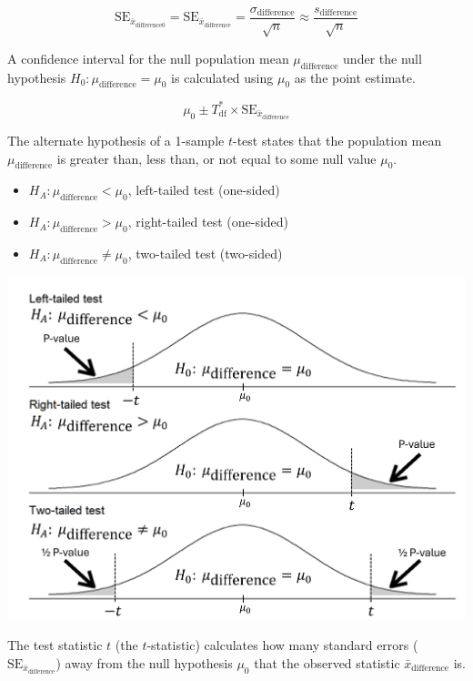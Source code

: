 \documentclass[
  letterpaper,
  DIV=11,
  numbers=noendperiod]{scrartcl}
\begin{document}
\[
\text{SE}_{\bar{x}_{\text{difference0}}}=\text{SE}_{\bar{x}_{\text{difference}}}=\frac{\sigma_{\text{difference}}}{\sqrt{n}} \approx \frac{s_{\text{difference}}}{\sqrt{n}}
\]

A confidence interval for the null population mean
\(\mu_{\text{difference}}\) under the null hypothesis
\(H_0 \colon \mu_{\text{difference}}=\mu_0\) is calculated using
\(\mu_0\) as the point estimate.

\[
\mu_0 \pm T_{\text{df}}^* \times \text{SE}_{\bar{x}_{\text{difference}}}
\]

The alternate hypothesis of a 1-sample \(t\)-test states that the
population mean \(\mu_{\text{difference}}\) is greater than, less than,
or not equal to some null value \(\mu_0\).

\begin{itemize}
\item
  \(H_A \colon \mu_{\text{difference}} < \mu_0\), left-tailed test
  (one-sided)
\item
  \(H_A \colon \mu_{\text{difference}} > \mu_0\), right-tailed test
  (one-sided)
\item
  \(H_A \colon \mu_{\text{difference}} \ne \mu_0\), two-tailed test
  (two-sided)
\end{itemize}

\includegraphics{cheatsheet_files/mediabag/paired-means-t-test.png}

The test statistic \(t\) (the \(t\)-statistic) calculates how many
standard errors (\(\text{SE}_{\bar{x}_{\text{difference}}}\)) away from
the null hypothesis \(\mu_0\) that the observed statistic
\(\bar{x}_{\text{difference}}\) is.
\end{document}
